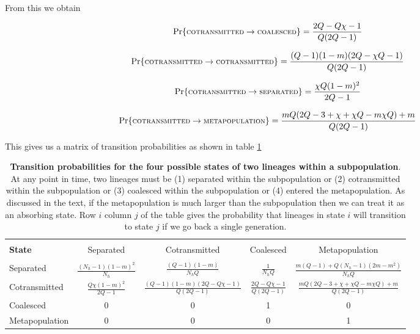 \documentclass[_main.tex]{subfiles}
\begin{document}
\noindent From this we obtain

\begin{equation*} \label{eq:coal321}
\Pr \{ \textsc{\small{cotransmitted}} \rightarrow \textsc{\small{coalesced}} \} 
= \frac{2Q - Q \chi - 1}{Q(2Q-1)} 
\end{equation*}

\begin{equation*} \label{eq:coal321}
\Pr \{ \textsc{\small{cotransmitted}} \rightarrow \textsc{\small{cotransmitted}} \} 
= \frac{(Q-1)(1-m)(2Q - \chi Q - 1)}{Q(2Q-1)}
\end{equation*}

\begin{equation*} \label{eq:coal321}
\Pr \{ \textsc{\small{cotransmitted}} \rightarrow \textsc{\small{separated}} \} 
= \frac{\chi Q (1-m)^2}{2Q-1}
\end{equation*}

\begin{equation*} \label{eq:coal321}
\Pr \{ \textsc{\small{cotransmitted}} \rightarrow \textsc{\small{metapopulation}} \} 
= \frac{mQ(2Q - 3 + \chi + \chi Q - m \chi Q) + m}{Q(2Q-1)} 
\end{equation*}

\noindent This gives us a matrix of transition probabilities as shown in table \ref{tab:tr_matrix_subpopulation}



\renewcommand\theadalign{bc} 

\begin{table}[h!] 
\centering
\large{
\begin{tabular}{l | c c c c } 
\hline \\
\textbf{\small{State}} & 
\small{Separated} & 
\small{Cotransmitted} & 
\small{Coalesced} & 
\small{Metapopulation}\\ [0.5ex] 
\hline \\
\small{Separated} & 
$\frac{(N_h - 1)(1-m)^2}{N_h}$ & 
$\frac{(Q -1)(1-m)}{N_h Q}$ &
$\frac{1}{N_h Q}$ &
$\frac{m(Q-1) + Q (N_h-1)(2m - m^2)}{N_h Q}$ \\ [2ex]
\small{Cotransmitted} &
$\frac{Q \chi (1-m)^2}{2Q-1}$ &
$\frac{(Q-1)(1-m)(2Q - Q \chi - 1)}{Q(2Q-1)}$ &
$\frac{2Q - Q \chi - 1}{Q(2Q-1)}$ &
$\frac{mQ(2Q - 3 + \chi + \chi Q - m \chi Q) + m}{Q(2Q-1)}$  \\ [2ex] 
\small{Coalesced} & 0 & 0 & 1 & 0 \\ [2ex] 
\small{Metapopulation} & 0 & 0 & 0 & 1 \\ [2ex] 
\end{tabular}
}
\caption{\small{\textbf{Transition probabilities for the four possible states of two lineages within a subpopulation}. At any point in time, two lineages must be (1) separated within the subpopulation or (2) cotransmitted within the subpopulation or (3) coalesced within the subpopulation or (4) entered the metapopulation. As discussed in the text, if the metapopulation is much larger than the subpopulation then we can treat it as an absorbing state.  Row $i$ column $j$ of the table gives the probability that lineages in state $i$ will transition to state $j$ if we go back a single generation.}}
\label{tab:tr_matrix_subpopulation}
\end{table}
\end{document}
